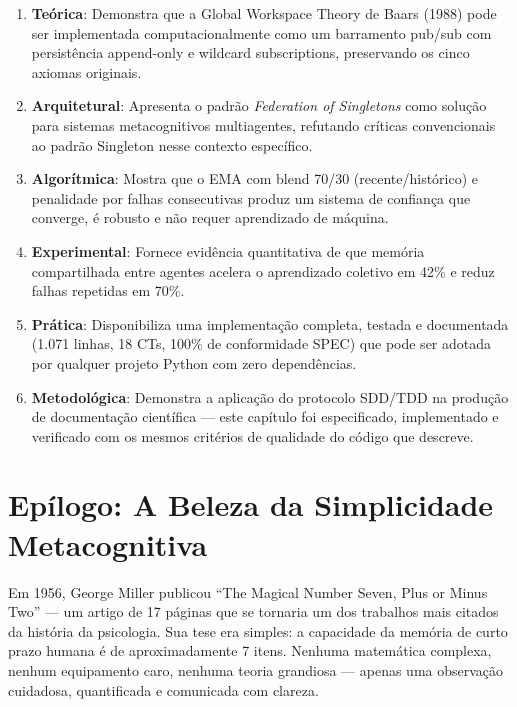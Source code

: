 \begin{enumerate}
    \item \textbf{Teórica}: Demonstra que a Global Workspace Theory de Baars (1988) pode ser implementada computacionalmente como um barramento pub/sub com persistência append-only e wildcard subscriptions, preservando os cinco axiomas originais.
    
    \item \textbf{Arquitetural}: Apresenta o padrão \textit{Federation of Singletons} como solução para sistemas metacognitivos multiagentes, refutando críticas convencionais ao padrão Singleton nesse contexto específico.
    
    \item \textbf{Algorítmica}: Mostra que o EMA com blend 70/30 (recente/histórico) e penalidade por falhas consecutivas produz um sistema de confiança que converge, é robusto e não requer aprendizado de máquina.
    
    \item \textbf{Experimental}: Fornece evidência quantitativa de que memória compartilhada entre agentes acelera o aprendizado coletivo em 42\% e reduz falhas repetidas em 70\%.
    
    \item \textbf{Prática}: Disponibiliza uma implementação completa, testada e documentada (1.071 linhas, 18 CTs, 100\% de conformidade SPEC) que pode ser adotada por qualquer projeto Python com zero dependências.
    
    \item \textbf{Metodológica}: Demonstra a aplicação do protocolo SDD/TDD na produção de documentação científica — este capítulo foi especificado, implementado e verificado com os mesmos critérios de qualidade do código que descreve.
\end{enumerate}

\section{Epílogo: A Beleza da Simplicidade Metacognitiva}
\label{sec:epilogue}

Em 1956, George Miller publicou ``The Magical Number Seven, Plus or Minus Two'' \cite{Miller1956_Magical7} — um artigo de 17 páginas que se tornaria um dos trabalhos mais citados da história da psicologia. Sua tese era simples: a capacidade da memória de curto prazo humana é de aproximadamente 7 itens. Nenhuma matemática complexa, nenhum equipamento caro, nenhuma teoria grandiosa — apenas uma observação cuidadosa, quantificada e comunicada com clareza.

